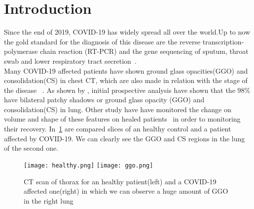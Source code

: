 \documentclass{standalone}
\begin{document}
\chapter*{Introduction}


Since the end of 2019, COVID-19 has widely spread all over the world.Up to now the gold standard for the diagnosis of this disease are the reverse transcription-polymerase chain reaction (RT-PCR) and the gene sequencing of sputum, throat swab and lower respiratory tract secretion~\cite{ART:Zhao}.\\ Many COVID-19 affected patients have shown ground glass opacities(GGO) and consolidation(CS) in chest CT, which are also made in relation with the stage of the disease ~\cite{ART:Bernheim}.  As shown by \cite{ART:Huang}, initial prospective analysis have shown that the $98\%$ have bilateral patchy shadows or ground glass opacity (GGO) and consolidation(CS) in lung. Other study have have monitored the change on volume and shape of these features on healed patients~\cite{ART:Ai} in order to monitoring their recovery. In \figurename\,\ref{fig:HealthVSCovid} are compared slices of an healthy control and a patient affected by COVID-19. We can clearly see the GGO and CS regions in the lung of the second one.\\
	
\begin{figure}[h!]
	\centering
	\texttt{[image: healthy.png]}
	\quad
	\texttt{[image: ggo.png]}
	\label{fig:HealthVSCovid}\caption{CT scan of thorax for an healthy patient(left) and a COVID-19 affected one(right) in which we can observe a huge amount of GGO in the right lung}
\end{figure} 
\end{document}
